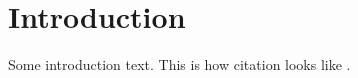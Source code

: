 \section{Introduction}

Some introduction text. This is how citation looks like \cite{may2016cryptococcus}. 

\newpage
